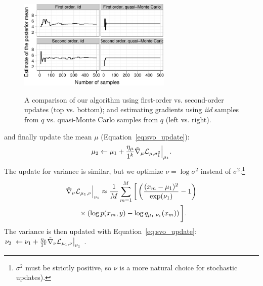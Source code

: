 \begin{figure}[t]
  \center
  \vspace{-10pt}
  \includegraphics[width=0.65\textwidth]{chapter_stochastic_variational_optimization/figures/mean_estimate_by_order_sampling.pdf} \\
  \vspace{-10pt}
  \caption{A comparison of our algorithm using first-order
  vs. second-order updates (top vs. bottom); and estimating gradients
  using \emph{iid} samples from $q$ vs. quasi-Monte Carlo samples from
  $q$ (left vs. right).}
  \label{fig:comparision_order_sampling}
  \vspace{-15pt}
\end{figure}
and finally update the mean $\mu$ (Equation~\ref{eq:svo_update}):
\begin{align}
  \label{eq:gaussian_mean}
  \mu_2 \gets \mu_{1}
    + \frac{\eta_\mu}{1^k}
    {\tilde \nabla_{ \mu}{  \mathcal{L}_{\mu, \sigma_1^2} }} \Bigr|_{\mu_{1}}.
\end{align}
The update for variance is similar, but we optimize $\nu = \log
\sigma^2$ instead of $\sigma^2$:\footnote{$\sigma^2$ must be strictly
positive, so $\nu$ is a more natural choice for stochastic updates).}
\begin{align}
  \label{eq:gaussian_variance_gradient}
  \partlapprox{ \mathcal{L}_{\mu_1, \nu} }{\nu} \Bigr|_{\nu_{1}} & \approx
  \frac{1}{M} \sum_{m=1}^M \bigg[ \left( \frac{ (x_{m} - \mu_{1})^2 }{ \exp(\nu_{1}) } - 1 \right) \\ \nonumber
  & \hspace{-30pt} \times \left( \log p(x_m, y) - \log q_{\mu_1, \nu_1}(x_m) \right) \bigg]. \nonumber
\end{align}
The variance is then updated with Equation~\ref{eq:svo_update}:
$ \nu_2~\gets \nu_{1} + \frac{\eta_\nu}{1^k} {\tilde \nabla_{ \nu}{  \mathcal{L}_{\mu_1, \nu} }} \bigr|_{\nu_{1}}$ .


